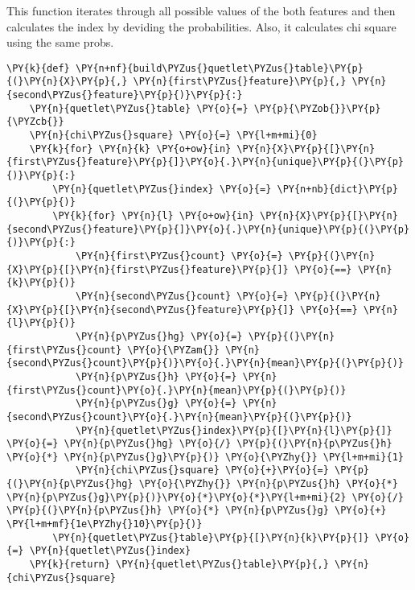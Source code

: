 This function iterates through all possible values of the both features
and then calculates the index by deviding the probabilities. Also, it
calculates chi square using the same probs.

    \begin{tcolorbox}[breakable, size=fbox, boxrule=1pt, pad at break*=1mm,colback=cellbackground, colframe=cellborder]
\begin{Verbatim}[commandchars=\\\{\}]
\PY{k}{def} \PY{n+nf}{build\PYZus{}quetlet\PYZus{}table}\PY{p}{(}\PY{n}{X}\PY{p}{,} \PY{n}{first\PYZus{}feature}\PY{p}{,} \PY{n}{second\PYZus{}feature}\PY{p}{)}\PY{p}{:}
    \PY{n}{quetlet\PYZus{}table} \PY{o}{=} \PY{p}{\PYZob{}}\PY{p}{\PYZcb{}}
    \PY{n}{chi\PYZus{}square} \PY{o}{=} \PY{l+m+mi}{0}
    \PY{k}{for} \PY{n}{k} \PY{o+ow}{in} \PY{n}{X}\PY{p}{[}\PY{n}{first\PYZus{}feature}\PY{p}{]}\PY{o}{.}\PY{n}{unique}\PY{p}{(}\PY{p}{)}\PY{p}{:}
        \PY{n}{quetlet\PYZus{}index} \PY{o}{=} \PY{n+nb}{dict}\PY{p}{(}\PY{p}{)}
        \PY{k}{for} \PY{n}{l} \PY{o+ow}{in} \PY{n}{X}\PY{p}{[}\PY{n}{second\PYZus{}feature}\PY{p}{]}\PY{o}{.}\PY{n}{unique}\PY{p}{(}\PY{p}{)}\PY{p}{:}
            \PY{n}{first\PYZus{}count} \PY{o}{=} \PY{p}{(}\PY{n}{X}\PY{p}{[}\PY{n}{first\PYZus{}feature}\PY{p}{]} \PY{o}{==} \PY{n}{k}\PY{p}{)}
            \PY{n}{second\PYZus{}count} \PY{o}{=} \PY{p}{(}\PY{n}{X}\PY{p}{[}\PY{n}{second\PYZus{}feature}\PY{p}{]} \PY{o}{==} \PY{n}{l}\PY{p}{)}
            \PY{n}{p\PYZus{}hg} \PY{o}{=} \PY{p}{(}\PY{n}{first\PYZus{}count} \PY{o}{\PYZam{}} \PY{n}{second\PYZus{}count}\PY{p}{)}\PY{o}{.}\PY{n}{mean}\PY{p}{(}\PY{p}{)}
            \PY{n}{p\PYZus{}h} \PY{o}{=} \PY{n}{first\PYZus{}count}\PY{o}{.}\PY{n}{mean}\PY{p}{(}\PY{p}{)}
            \PY{n}{p\PYZus{}g} \PY{o}{=} \PY{n}{second\PYZus{}count}\PY{o}{.}\PY{n}{mean}\PY{p}{(}\PY{p}{)}
            \PY{n}{quetlet\PYZus{}index}\PY{p}{[}\PY{n}{l}\PY{p}{]} \PY{o}{=} \PY{n}{p\PYZus{}hg} \PY{o}{/} \PY{p}{(}\PY{n}{p\PYZus{}h} \PY{o}{*} \PY{n}{p\PYZus{}g}\PY{p}{)} \PY{o}{\PYZhy{}} \PY{l+m+mi}{1}
            \PY{n}{chi\PYZus{}square} \PY{o}{+}\PY{o}{=} \PY{p}{(}\PY{n}{p\PYZus{}hg} \PY{o}{\PYZhy{}} \PY{n}{p\PYZus{}h} \PY{o}{*} \PY{n}{p\PYZus{}g}\PY{p}{)}\PY{o}{*}\PY{o}{*}\PY{l+m+mi}{2} \PY{o}{/} \PY{p}{(}\PY{n}{p\PYZus{}h} \PY{o}{*} \PY{n}{p\PYZus{}g} \PY{o}{+} \PY{l+m+mf}{1e\PYZhy{}10}\PY{p}{)}
        \PY{n}{quetlet\PYZus{}table}\PY{p}{[}\PY{n}{k}\PY{p}{]} \PY{o}{=} \PY{n}{quetlet\PYZus{}index}
    \PY{k}{return} \PY{n}{quetlet\PYZus{}table}\PY{p}{,} \PY{n}{chi\PYZus{}square}
\end{Verbatim}
\end{tcolorbox}

